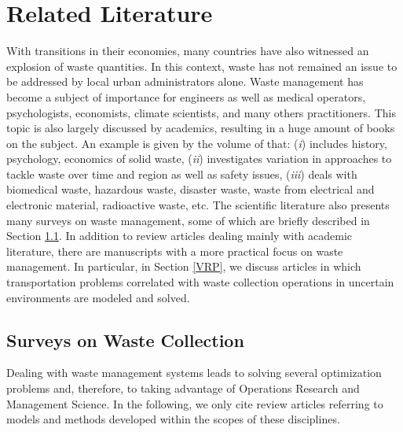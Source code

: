 \documentclass[preprint,11pt,authoryear]{elsarticle}
\begin{document}
\section{Related Literature}\label{literature}
With transitions in their economies, many countries have also witnessed an explosion of waste quantities. In this context, waste has not remained an issue to be addressed by local urban administrators alone. Waste management has become a subject of importance for engineers as well as medical operators, psychologists, economists, climate scientists, and many others practitioners. This topic is also largely discussed by academics, resulting in a huge amount of books on the subject. An example is given by the volume of  \cite{Chandrappa2012} that: (\textit{i}) includes history, psychology, economics of solid waste, (\textit{ii}) investigates variation in approaches to tackle  waste over time and region as well as safety issues, (\textit{iii}) deals with biomedical waste, hazardous waste, disaster waste, waste from electrical and electronic material, radioactive waste, etc.   
%
The scientific literature also presents many surveys on waste management, some of which are briefly described in Section \ref{surveys}. In addition to review articles dealing mainly with academic literature, there are manuscripts with a more practical focus on waste management. In particular, in Section \ref{VRP}, we discuss articles in which transportation problems correlated with waste collection operations in uncertain environments are modeled and solved.  

\subsection{Surveys on Waste Collection}\label{surveys}
Dealing with waste management systems leads to solving several optimization problems and, therefore, to taking advantage of Operations Research and Management Science. In the following, we only cite review articles referring to models and methods developed within the scopes of these disciplines. 
\end{document}
